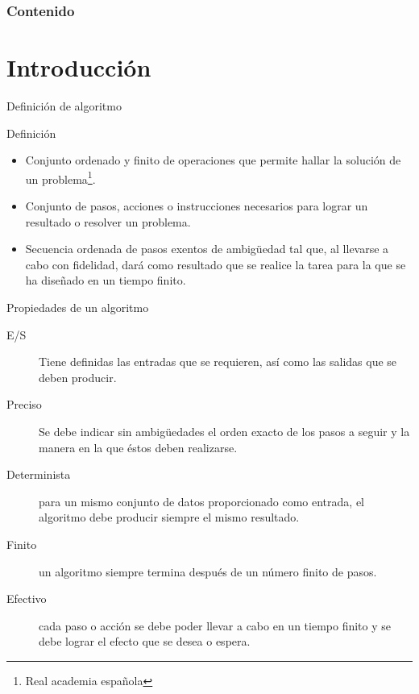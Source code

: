 
\begin{frame}
    \frametitle{Contenido}
    \tableofcontents
\end{frame}

\section{Introducción}

\begin{frame}[c]{Definición de algoritmo}
  \begin{block}{Definición}
    \begin{itemize}
      \item Conjunto ordenado y finito de operaciones que permite hallar
            la solución de un problema\footnote{Real academia española}.
      \pausa
      \item Conjunto de pasos, acciones o instrucciones necesarios para
            lograr un resultado o resolver un problema.
      \pausa
      \item Secuencia ordenada de pasos exentos de ambigüedad tal que, al
            llevarse a cabo con fidelidad, dará como resultado que se realice
            la tarea para la que se ha diseñado en un tiempo finito.
    \end{itemize}
  \end{block}
\end{frame}

\begin{frame}[c]{Propiedades de un algoritmo}
  \begin{description}
    \item[E/S] Tiene definidas las entradas que se requieren, así como las
      salidas que se deben producir.
    \pausa
    \item[Preciso] Se debe indicar sin ambigüedades el orden exacto de los
      pasos a seguir y la manera en la que éstos deben realizarse.
    \pausa
    \item[Determinista] para un mismo conjunto de datos proporcionado como
      entrada, el algoritmo debe producir siempre el mismo resultado.
    \pausa
    \item[Finito] un algoritmo siempre termina después de un número finito
      de pasos.
    \pausa
    \item[Efectivo] cada paso o acción se debe poder llevar a cabo en un
      tiempo finito y se debe lograr el efecto que se desea o espera.
  \end{description}
\end{frame}

